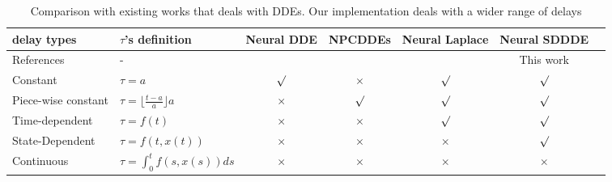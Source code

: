 \begin{table}
\caption{Comparison with existing works that deals with DDEs. Our implementation deals with a wider range of delays}
\label{table_delays}
\vskip 0.15in
\begin{center}
\begin{small}
\begin{sc}
\resizebox{16cm}{!}
{
\begin{tabular}{l|lccccr}
\hline
delay types  & $\tau$'s definition  & Neural DDE  &  NPCDDEs  & Neural Laplace  & Neural SDDDE \\
\hline
References & - & \citet{first_neural_dde} & \citet{neural_piece_wise_dde} & \citet{neural_laplace} & This work \\
Constant & $\tau = a  $  & $\surd$ & $\times$ & $\surd$ & $\surd$    \\
Piece-wise constant  & $\tau = \lfloor \frac{t-a}{a} \rfloor a$ & $\times$   & $\surd$ & $\surd$ & $\surd$ \\
Time-dependent   & $\tau = f(t)$  & $\times$ & $\times$ & $\surd$ & $\surd$ \\
State-Dependent  & $\tau = f(t, x(t))$  & $\times$ &  $\times$  & $\times$ & $\surd$        \\
Continuous  & $\tau = \int_0^{t}f(s, x(s)) ds $ & $\times$ & $\times$ & $\times$ & $\times$  \\
\hline
\end{tabular}
}
\end{sc}
\end{small}
\end{center}
\end{table}